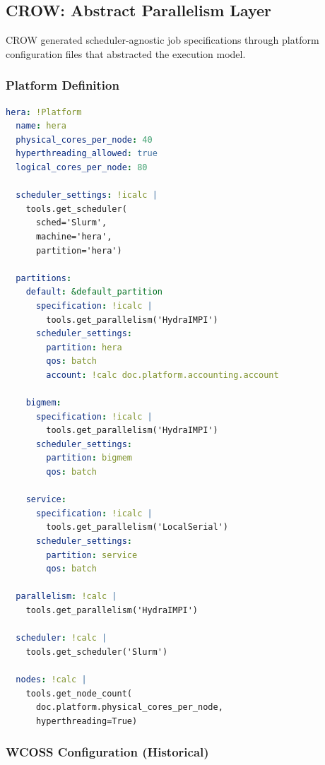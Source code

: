 \documentclass[11pt,twoside]{article}
\newcommand{\crow}{\textsc{CROW}}
\begin{document}
\subsection{CROW: Abstract Parallelism Layer}
\label{sec:crow-parallel}

\crow{} generated scheduler-agnostic job specifications through platform configuration files that abstracted the execution model.

\subsubsection{Platform Definition}

\begin{lstlisting}[language=YAML, caption={\crow{} Hera Platform Configuration}]
hera: !Platform
  name: hera
  physical_cores_per_node: 40
  hyperthreading_allowed: true
  logical_cores_per_node: 80
  
  scheduler_settings: !icalc |
    tools.get_scheduler(
      sched='Slurm',
      machine='hera',
      partition='hera')
  
  partitions:
    default: &default_partition
      specification: !icalc |
        tools.get_parallelism('HydraIMPI')
      scheduler_settings:
        partition: hera
        qos: batch
        account: !calc doc.platform.accounting.account
        
    bigmem:
      specification: !icalc |
        tools.get_parallelism('HydraIMPI')  
      scheduler_settings:
        partition: bigmem
        qos: batch
        
    service:
      specification: !icalc |
        tools.get_parallelism('LocalSerial')
      scheduler_settings:
        partition: service
        qos: batch
  
  parallelism: !calc |
    tools.get_parallelism('HydraIMPI')
    
  scheduler: !calc |
    tools.get_scheduler('Slurm')
    
  nodes: !calc |
    tools.get_node_count(
      doc.platform.physical_cores_per_node,
      hyperthreading=True)
\end{lstlisting}

\subsubsection{WCOSS Configuration (Historical)}
\end{document}
